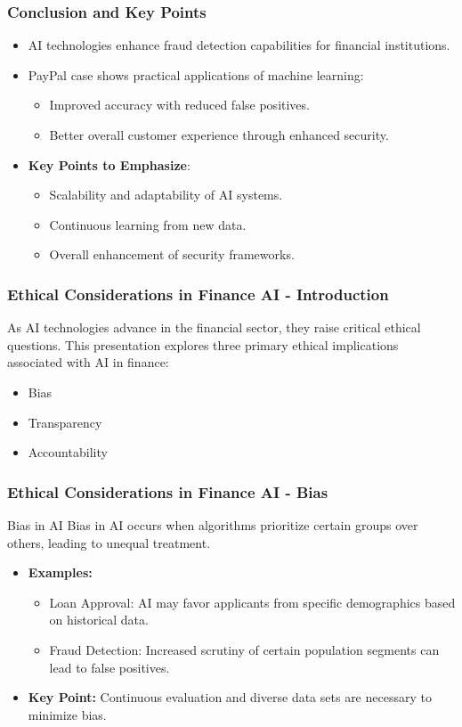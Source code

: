\documentclass[aspectratio=169]{beamer}
\begin{document}
\begin{frame}[fragile]
    \frametitle{Conclusion and Key Points}
    \begin{itemize}
        \item AI technologies enhance fraud detection capabilities for financial institutions.
        \item PayPal case shows practical applications of machine learning:
        \begin{itemize}
            \item Improved accuracy with reduced false positives.
            \item Better overall customer experience through enhanced security.
        \end{itemize}
        \item \textbf{Key Points to Emphasize}:
        \begin{itemize}
            \item Scalability and adaptability of AI systems.
            \item Continuous learning from new data.
            \item Overall enhancement of security frameworks.
        \end{itemize}
    \end{itemize}
\end{frame}

\begin{frame}[fragile]
    \frametitle{Ethical Considerations in Finance AI - Introduction}
    As AI technologies advance in the financial sector, they raise critical ethical questions. This presentation explores three primary ethical implications associated with AI in finance:
    \begin{itemize}
        \item Bias
        \item Transparency
        \item Accountability
    \end{itemize}
\end{frame}

\begin{frame}[fragile]
    \frametitle{Ethical Considerations in Finance AI - Bias}
    \begin{block}{Bias in AI}
        Bias in AI occurs when algorithms prioritize certain groups over others, leading to unequal treatment.
    \end{block}
    \begin{itemize}
        \item \textbf{Examples:}
        \begin{itemize}
            \item Loan Approval: AI may favor applicants from specific demographics based on historical data.
            \item Fraud Detection: Increased scrutiny of certain population segments can lead to false positives.
        \end{itemize}
        \item \textbf{Key Point:} Continuous evaluation and diverse data sets are necessary to minimize bias.
    \end{itemize}
\end{frame}
\end{document}
